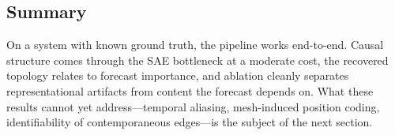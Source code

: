 \subsection{Summary}

On a system with known ground truth, the pipeline works end-to-end. Causal
structure comes through the SAE bottleneck at a moderate cost, the recovered
topology relates to forecast importance, and ablation cleanly separates
representational artifacts from content the forecast depends on. What these
results cannot yet address---temporal aliasing, mesh-induced position coding,
identifiability of contemporaneous edges---is the subject of the next section.
